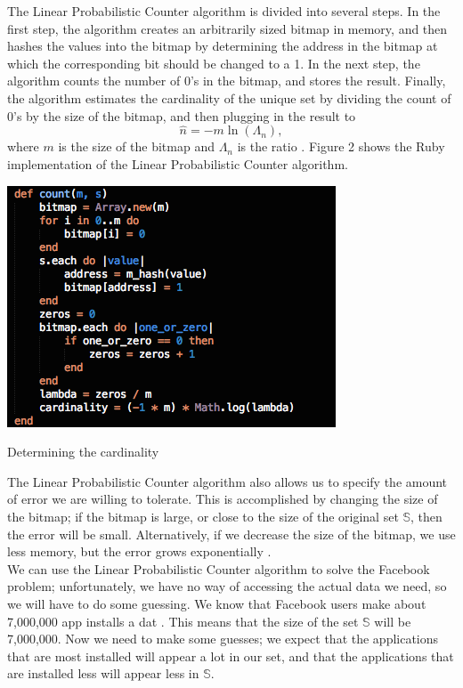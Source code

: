 \documentclass{article}
\begin{document}
\indent The Linear Probabilistic Counter algorithm is divided into several steps. In the first step, the algorithm creates an arbitrarily sized bitmap in memory, and then hashes the values into the bitmap by determining the address in the bitmap at which the corresponding bit should be changed to a 1.
In the next step, the algorithm counts the number of 0's in the bitmap, and stores the result.
Finally, the algorithm estimates the cardinality of the unique set by dividing the count of 0's by the size of the bitmap, and then plugging in the result to
\[
\hat{n} = -m \ln{(\Lambda_{n})},
\]
where $m$ is the size of the bitmap and $\Lambda_{n}$ is the ratio \cite{Whang}. 
Figure 2 shows the Ruby implementation of the Linear Probabilistic Counter algorithm.
\begin{floatingfigure}[R]{6cm}
\begin{framed}
\centering
\includegraphics[scale=0.4]{fb_problem/lpc}
\caption{Determining the cardinality}
\end{framed}
\end{floatingfigure}
\noindent The Linear Probabilistic Counter algorithm also allows us to specify the amount of error we are willing to tolerate.
This is accomplished by changing the size of the bitmap; if the bitmap is large, or close to the size of the original set $\mathbb{S}$, then the error will be small.
Alternatively, if we decrease the size of the bitmap, we use less memory, but the error grows exponentially \cite{Hoff}.\\
\indent We can use the Linear Probabilistic Counter algorithm to solve the Facebook problem; unfortunately, we have no way of accessing the actual data we need, so we will have to do some guessing. 
We know that Facebook users make about 7,000,000 app installs a dat \cite{Facebook-2}.
This means that the size of the set $\mathbb{S}$ will be 7,000,000.
Now we need to make some guesses; we expect that the applications that are most installed will appear a lot in our set, and that the applications that are installed less will appear less in $\mathbb{S}$. 
\end{document}

